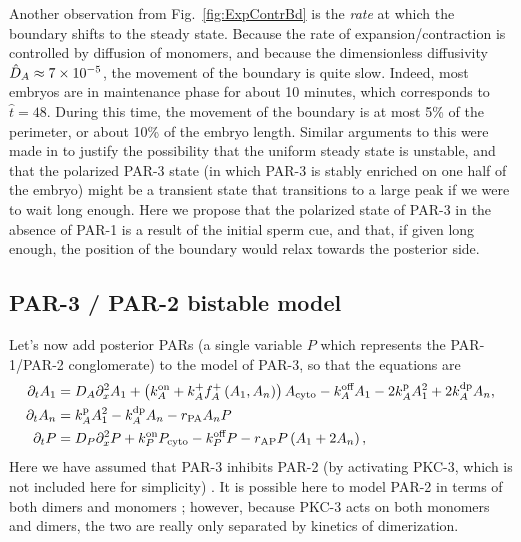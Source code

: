 \documentclass[11pt]{article}
\newcommand{\red}[1]{\color{red}#1\normalcolor}
\newcommand{\6}[1]{#1_{\text{6}}}
\newcommand{\3}[1]{#1_{\text{3}}}
\newcommand{\A}[1]{#1_A}
\begin{document}
Another observation from Fig.\ \ref{fig:ExpContrBd} is the \emph{rate} at which the boundary shifts to the steady state. Because the rate of expansion/contraction is controlled by diffusion of monomers, and because the dimensionless diffusivity $\hat{D}_A \approx 7 \times 10^{-5}$,  the movement of the boundary is quite slow. Indeed, most embryos are in maintenance phase for about 10 minutes, which corresponds to $\hat t = 48$. During this time, the movement of the boundary is at most 5\% of the perimeter, or about 10\% of the embryo length. \red{Similar arguments to this were made in \cite{lang2022oligomerization} to justify the possibility that the uniform steady state is unstable, and that the polarized PAR-3 state (in which PAR-3 is stably enriched on one half of the embryo) \cite{lang2023oligomerization} might be a transient state that transitions to a large peak if we were to wait long enough. Here we propose that the polarized state of PAR-3 in the absence of PAR-1 is a result of the initial sperm cue, and that, if given long enough, the position of the boundary would relax towards the posterior side. }

\subsection{PAR-3 / PAR-2 bistable model \label{sec:P2P3}}
Let's now add posterior PARs (a single variable $P$ which represents the PAR-1/PAR-2 conglomerate) to the model of PAR-3, so that the equations are 
\begin{subequations}
\label{eq:P32}
\begin{align}
\Dt A_1 &= D_A \Dx^2 A_1 +\left( \kon_A +\A{\kf}\A{f}^+\left(\MA,\PA\right)\right) A_\text{cyto} - \koff_A \MA -2\kp_A \MA^2+2\kdp_A \PA,\\
\Dt \PA &= \kp_A \MA^2 - \kdp_A \PA-r_\text{PA} \PA P\\
\Dt P &= D_P \Dx^2 P + \kon_P P_\text{cyto} - \koff_P P -r_\text{AP} P\left(\MA+2\PA\right),%
\end{align}
\end{subequations}
Here we have assumed that PAR-3 inhibits PAR-2 (by activating PKC-3, which is not included here for simplicity) \cite{lang2017proteins}. It is possible here to model PAR-2 in terms of both dimers and monomers \cite{bland2023optimized}; however, because PKC-3 acts on both monomers and dimers, the two are really only separated by kinetics of dimerization. 
\end{document}
